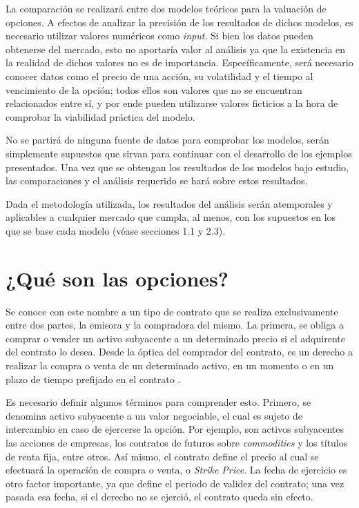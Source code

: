 La comparación se realizará entre dos modelos teóricos para la valuación de opciones. A efectos de analizar la precisión de los resultados de dichos modelos, es necesario utilizar valores numéricos como \textit{input}. Si bien los datos pueden obtenerse del mercado, esto no aportaría valor al análisis ya que la existencia en la realidad de dichos valores no es de importancia. Específicamente, será necesario conocer datos como el precio de una acción, su volatilidad y el tiempo al vencimiento de la opción; todos ellos son valores que no se encuentran relacionados entre sí, y por ende pueden utilizarse valores ficticios a la hora de comprobar la viabilidad práctica del modelo. 

No se partirá de ninguna fuente de datos para comprobar los modelos, serán simplemente supuestos que sirvan para continuar con el desarrollo de los ejemplos presentados. Una vez que se obtengan los resultados de los modelos bajo estudio, las comparaciones y el análisis requerido se hará sobre estos resultados.

Dada el metodología utilizada, los resultados del análisis serán atemporales y aplicables a cualquier mercado que cumpla, al menos, con los supuestos en los que se base cada modelo (véase secciones 1.1 y 2.3).



\section*{¿Qué son las opciones?}

Se conoce con este nombre a un tipo de contrato que se realiza exclusivamente entre dos partes, la emisora y la compradora del mismo. La primera, se obliga a comprar o vender un activo subyacente a un determinado precio si el adquirente del contrato lo desea. Desde la óptica del comprador del contrato, es un derecho a realizar la compra o venta de un determinado activo, en un momento o en un plazo de tiempo prefijado en el contrato \cite{hull}.

Es necesario definir algunos términos para comprender esto. Primero, se denomina activo subyacente a un valor negociable, el cual es sujeto de intercambio en caso de ejercerse la opción. Por ejemplo, son activos subyacentes las acciones de empresas, los contratos de futuros sobre \textit{commodities} y los títulos de renta fija, entre otros. Así mismo, el contrato define el precio al cual se efectuará la operación de compra o venta, o \textit{Strike Price}. La fecha de ejercicio es otro factor importante, ya que define el periodo de validez del contrato; una vez pasada esa fecha, si el derecho no se ejerció, el contrato queda sin efecto.

